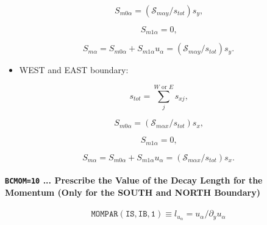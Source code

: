 \documentclass[11pt]{article}
\begin{document}
\begin{equation}
S_{m0\alpha}=\left( \mathcal{S}_{m\alpha y}/s_{tot}\right) s_{y}\text{,} 
\label{c150}
\end{equation}

\begin{equation}
S_{m1\alpha}=0\text{,}   \label{c151}
\end{equation}

\begin{equation}
S_{m\alpha}=S_{m0\alpha}+S_{m1\alpha}u_{\alpha}=\left( \mathcal{S}_{m\alpha
y}/s_{tot}\right) s_{y}\text{.}   \label{c152}
\end{equation}

\bigskip

\begin{itemize}
\item  WEST and EAST boundary:
\end{itemize}

\bigskip

\begin{equation}
s_{tot}=\sum_{j}^{W\text{ or }E}s_{xj}\text{,}   \label{c153}
\end{equation}

\begin{equation}
S_{m0\alpha}=\left( \mathcal{S}_{m\alpha x}/s_{tot}\right) s_{x}\text{,} 
\label{c154}
\end{equation}

\begin{equation}
S_{m1\alpha}=0\text{,}   \label{c155}
\end{equation}

\begin{equation}
S_{m\alpha}=S_{m0\alpha}+S_{m1\alpha}u_{\alpha}=\left( \mathcal{S}_{m\alpha
x}/s_{tot}\right) s_{x}\text{.}   \label{c156}
\end{equation}

\bigskip

\paragraph{\texttt{BCMOM=10} ... Prescribe the Value of the Decay Length for
the Momentum (Only for the SOUTH and NORTH Boundary)}

\bigskip

\begin{equation*}
\mathtt{MOMPAR(IS,IB,1)}\equiv
l_{u_{\alpha}}=u_{\alpha}/\partial_{y}u_{\alpha}
\end{equation*}
\end{document}
